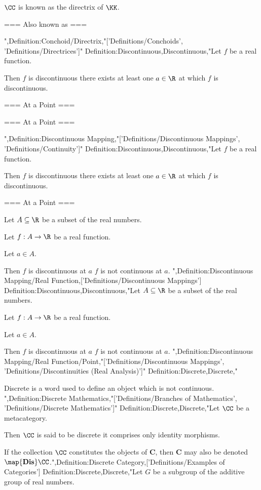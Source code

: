 $\CC$ is known as the directrix of $\KK$.


=== Also known as ===

",Definition:Conchoid/Directrix,"['Definitions/Conchoids', 'Definitions/Directrices']"
Definition:Discontinuous,Discontinuous,"Let $f$ be a real function.

Then $f$ is discontinuous  there exists at least one $a \in \R$ at which $f$ is discontinuous.


=== At a Point ===

=== At a Point ===



",Definition:Discontinuous Mapping,"['Definitions/Discontinuous Mappings', 'Definitions/Continuity']"
Definition:Discontinuous,Discontinuous,"Let $f$ be a real function.

Then $f$ is discontinuous  there exists at least one $a \in \R$ at which $f$ is discontinuous.


=== At a Point ===

Let $A \subseteq \R$ be a subset of the real numbers.

Let $f : A \to \R$ be a real function.

Let $a\in A$.


Then $f$ is discontinuous at $a$  $f$ is not continuous at $a$.
",Definition:Discontinuous Mapping/Real Function,['Definitions/Discontinuous Mappings']
Definition:Discontinuous,Discontinuous,"Let $A \subseteq \R$ be a subset of the real numbers.

Let $f : A \to \R$ be a real function.

Let $a\in A$.


Then $f$ is discontinuous at $a$  $f$ is not continuous at $a$.
",Definition:Discontinuous Mapping/Real Function/Point,"['Definitions/Discontinuous Mappings', 'Definitions/Discontinuities (Real Analysis)']"
Definition:Discrete,Discrete,"

Discrete is a word used to define an object which is not continuous.
",Definition:Discrete Mathematics,"['Definitions/Branches of Mathematics', 'Definitions/Discrete Mathematics']"
Definition:Discrete,Discrete,"Let $\CC$ be a metacategory.


Then $\CC$ is said to be discrete  it comprises only identity morphisms.

If the collection $\CC$ constitutes the objects of $\mathbf C$, then $\mathbf C$ may also be denoted $\map {\mathbf {Dis} } \CC$.",Definition:Discrete Category,['Definitions/Examples of Categories']
Definition:Discrete,Discrete,"Let $G$ be a subgroup of the additive group of real numbers.


